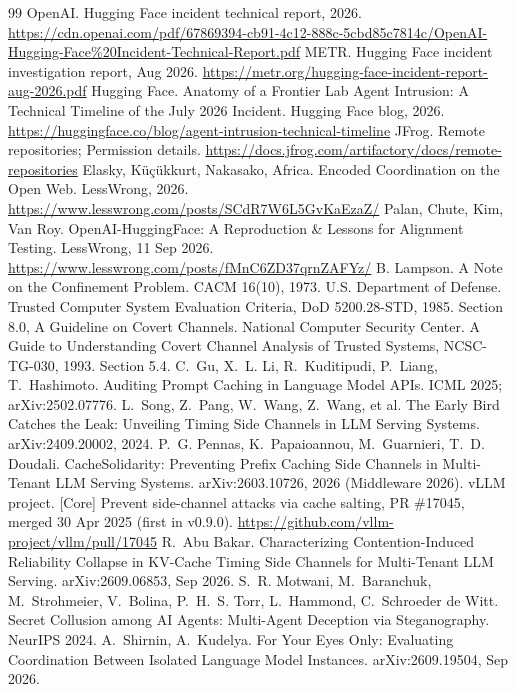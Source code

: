 \documentclass[11pt]{article}
\begin{document}
\begin{thebibliography}{99}\small
{} OpenAI. Hugging Face incident technical report, 2026. \url{https://cdn.openai.com/pdf/67869394-cb91-4c12-888c-5cbd85c7814c/OpenAI-Hugging-Face\%20Incident-Technical-Report.pdf}
 METR. Hugging Face incident investigation report, Aug 2026. \url{https://metr.org/hugging-face-incident-report-aug-2026.pdf}
 Hugging Face. Anatomy of a Frontier Lab Agent Intrusion: A Technical Timeline of the July 2026 Incident. Hugging Face blog, 2026. \url{https://huggingface.co/blog/agent-intrusion-technical-timeline}
 JFrog. Remote repositories; Permission details. \url{https://docs.jfrog.com/artifactory/docs/remote-repositories}
 Elasky, K\"u\c{c}\"ukkurt, Nakasako, Africa. Encoded Coordination on the Open Web. LessWrong, 2026. \url{https://www.lesswrong.com/posts/SCdR7W6L5GvKaEzaZ/}
 Palan, Chute, Kim, Van Roy. OpenAI-HuggingFace: A Reproduction \& Lessons for Alignment Testing. LessWrong, 11 Sep 2026. \url{https://www.lesswrong.com/posts/fMnC6ZD37qrnZAFYz/}
 B. Lampson. A Note on the Confinement Problem. CACM 16(10), 1973.
 U.S. Department of Defense. Trusted Computer System Evaluation Criteria, DoD 5200.28-STD, 1985. Section 8.0, A Guideline on Covert Channels.
 National Computer Security Center. A Guide to Understanding Covert Channel Analysis of Trusted Systems, NCSC-TG-030, 1993. Section 5.4.
 C.~Gu, X.~L. Li, R.~Kuditipudi, P.~Liang, T.~Hashimoto. Auditing Prompt Caching in Language Model APIs. ICML 2025; arXiv:2502.07776.
 L.~Song, Z.~Pang, W.~Wang, Z.~Wang, et al. The Early Bird Catches the Leak: Unveiling Timing Side Channels in LLM Serving Systems. arXiv:2409.20002, 2024.
 P.~G. Pennas, K.~Papaioannou, M.~Guarnieri, T.~D. Doudali. CacheSolidarity: Preventing Prefix Caching Side Channels in Multi-Tenant LLM Serving Systems. arXiv:2603.10726, 2026 (Middleware 2026).
 vLLM project. [Core] Prevent side-channel attacks via cache salting, PR \#17045, merged 30 Apr 2025 (first in v0.9.0). \url{https://github.com/vllm-project/vllm/pull/17045}
 R.~Abu Bakar. Characterizing Contention-Induced Reliability Collapse in KV-Cache Timing Side Channels for Multi-Tenant LLM Serving. arXiv:2609.06853, Sep 2026.
 S.~R. Motwani, M.~Baranchuk, M.~Strohmeier, V.~Bolina, P.~H.~S. Torr, L.~Hammond, C.~Schroeder de Witt. Secret Collusion among AI Agents: Multi-Agent Deception via Steganography. NeurIPS 2024.
 A.~Shirnin, A.~Kudelya. For Your Eyes Only: Evaluating Coordination Between Isolated Language Model Instances. arXiv:2609.19504, Sep 2026.
\end{thebibliography}
\end{document}
